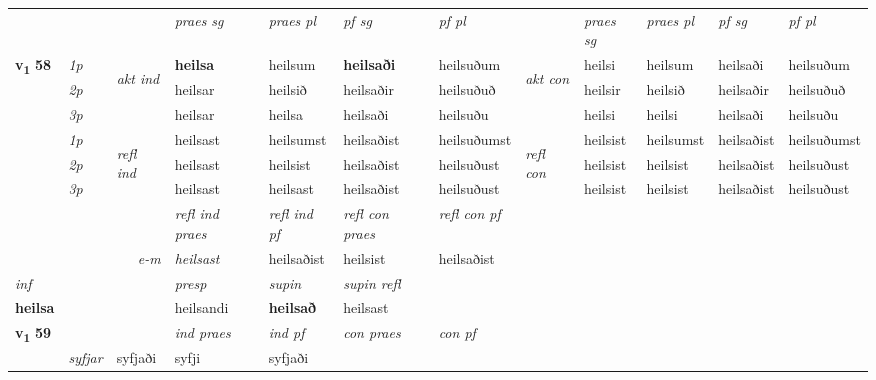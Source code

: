 \begin{longtable}[l]{X>{\footnotesize\itshape}llXXXXlXXXX}
\midrule

 & &   & \textit{praes sg}  & \textit{praes pl}    & \textit{ pf sg} & \textit{pf pl} & & \textit{praes sg}  & \textit{praes pl}    & \textit{pf sg} & \textit{pf pl }  \\ \cmidrule{4-7} \cmidrule{9-12}
 \multirow{2}{*}{{{\textbf{v{\textsubscript{1}}} \Large{\textbf{58}}}}}  & 1p & \multirow{3}{*}{\begin{turn}{90}\textit{akt ind}\end{turn}} & \textbf{heilsa} & heilsum & \textbf{heilsaði} & heilsuðum & \multirow{3}{*}{\begin{turn}{90}\textit{akt con}\end{turn}} &heilsi & heilsum & heilsaði & heilsuðum\\*
 & 2p &  &  heilsar  & heilsið & heilsaðir & heilsuðuð & & heilsir & heilsið & heilsaðir & heilsuðuð \\*
 & 3p &  & heilsar & heilsa & heilsaði & heilsuðu & & heilsi & heilsi& heilsaði & heilsuðu \\*
\cmidrule{4-7} \cmidrule{9-12}
 & 1p & \multirow{3}{*}{\begin{turn}{90}\textit{refl ind}\end{turn}}  & heilsast & heilsumst & heilsaðist & heilsuðumst & \multirow{3}{*}{\begin{turn}{90}\textit{refl con}\end{turn}}  &heilsist & heilsumst & heilsaðist & heilsuðumst \\*
 & 2p &  & heilsast & heilsist & heilsaðist & heilsuðust & &heilsist & heilsist & heilsaðist & heilsuðust \\*
 & 3p  & & heilsast & heilsast & heilsaðist & heilsuðust & & heilsist & heilsist& heilsaðist & heilsuðust \\*
\cmidrule{4-7} \cmidrule{9-12}

 & && \textit{refl ind praes} & \textit{refl ind pf} & \textit{refl con praes} & \textit{refl con pf} \\*
\multicolumn{3}{r}{\textit{e-m}}& heilsast & heilsaðist & heilsist & heilsaðist \\*

\cmidrule{4-7}
   {\textit{inf}} & &     & \textit{presp} & \textit{supin} & \textit{supin refl}  \\*
  {\textbf{heilsa}} & &     & heilsandi &  \textbf{heilsað} & heilsast  \\*

\midrule

\multirow{2}{*}{{{\textbf{v{\textsubscript{1}}} \Large{\textbf{59}}}}}  &&&  \textit{ind praes} & \textit{ind pf} & \textit{con praes} & \textit{con pf} \\*
\multicolumn{3}{r}{\textit{e-n}} & syfjar & syfjaði & syfji & syfjaði \\*


\end{longtable}
